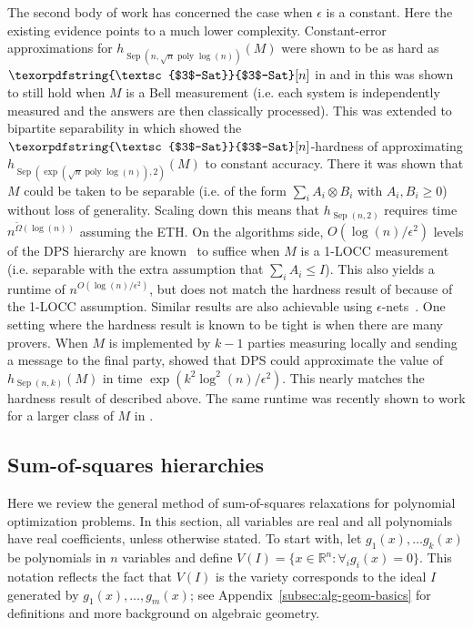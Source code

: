 \documentclass[aps,pra,notitlepage,preprintnumbers,11pt,tightenlines]{revtex4-1}
\newcommand{\eps}{\epsilon}
\newcommand{\RR}{\mathbb{R}}
\newcommand{\ot}{\otimes}
\DeclareMathOperator{\Sep}{Sep}
\DeclareMathOperator{\poly}{poly}
\newcommand{\problemmacro}[1]{\texorpdfstring{\textsc{#1}}{#1}\xspace}
\newcommand{\threesat}{\problemmacro{$3$-Sat}}
\begin{document}
The second body of work has concerned the case when $\eps$ is a
constant.  Here the existing evidence points to a much lower complexity.
Constant-error approximations for $h_{\Sep(n,\sqrt{n}\poly\log(n))}(M)$
were shown to be as hard as $\threesat[n]$ in \cite{AaronsonBDFS08}
and in \cite{chen10} this was shown to still hold when $M$ is a Bell
measurement (i.e. each system is independently measured and the
answers are then classically processed).  This was extended to
bipartite separability in \cite{HM13} which showed the $\threesat[n]$-hardness of
approximating 
$h_{\Sep(\exp(\sqrt{n}\poly\log(n)),2)}(M)$ to constant accuracy.
There it was shown that $M$ could be taken to be separable (i.e. of
the form $\sum_i A_i \ot B_i$ with $A_i,B_i \geq 0$) without loss of
generality.  Scaling down this means that $h_{\Sep(n,2)}$ requires
time $n^{\tilde\Omega(\log(n))}$ assuming the ETH.  On the algorithms side, $O(\log(n)/\eps^2)$ levels of the
DPS hierarchy are known~\cite{brandao11,LW14,BH-local} to suffice when
$M$ is a 1-LOCC measurement (i.e. separable with the extra assumption
that $\sum_i A_i \leq I$).   This also yields a runtime of
$n^{O(\log(n)/\eps^2)}$, but does not match the hardness result of
\cite{HM13} because of the 1-LOCC assumption.  Similar results are
also achievable using $\eps$-nets~\cite{shi12,BH14}.  One setting
where the hardness result is known to be tight is when there are many
provers.  When $M$ is implemented by $k-1$ parties measuring locally
and sending a message to the final party, \cite{BH-local} showed that
DPS could approximate the value of $h_{\Sep(n,k)}(M)$ in time
$\exp(k^2\log^2(n)/\eps^2)$.  This nearly matches the hardness result
of \cite{chen10} described above.  The same runtime was recently shown to work
for a larger class of $M$ in \cite{LS14}.



\subsection{Sum-of-squares hierarchies}\label{sec:sos}

Here we review the general method of sum-of-squares relaxations for
polynomial optimization problems. In this section, all variables are
real and all polynomials have real coefficients, unless otherwise
stated.  To start with, let $g_1(x), \dots g_k(x)$ be polynomials in
$n$ variables and define
$V(I) = \{ x \in \RR^n: \forall_i g_i(x) = 0\}$.  This notation
reflects the fact that $V(I)$ is the variety corresponds to the ideal
$I$ generated by $g_1(x),\ldots,g_m(x)$; see
Appendix~\ref{subsec:alg-geom-basics} for definitions and more
background on algebraic geometry.
\end{document}
